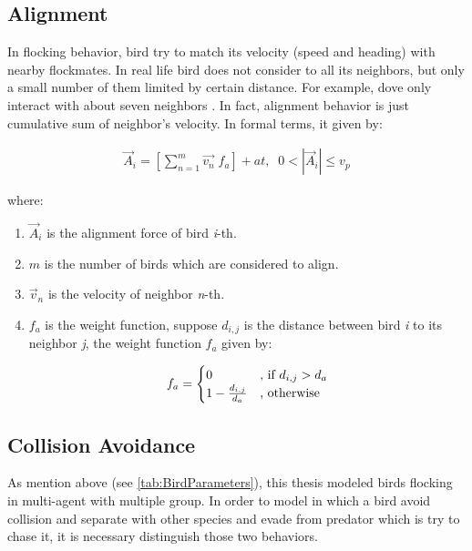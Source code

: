 \documentclass[journal,transmag]{IEEEtran}
\begin{document}
\subsection{Alignment}
In flocking behavior, bird try to match its velocity (speed and heading) with nearby flockmates. In real life bird does not consider to all its neighbors, but only a small number of them limited by certain distance. For example, dove only interact with about seven neighbors \cite{phys.org}. In fact, alignment behavior is just cumulative sum of neighbor's velocity. In formal terms, it given by:

\begin{align}
\vec{A}_i = \left[\sum_{n=1}^m{\vec{v_n}}\;f_a\right] + at, \;\;0 < |\vec{A}_i| \leq v_p
\end{align}

where:

\begin{enumerate}
\item \(\vec{A}_i\) is the alignment force of bird \emph{i}-th. 
\item \(m\) is the number of birds which are considered to align.
\item \(\vec{v}_n\) is the velocity of neighbor \emph{n}-th.
\item \(f_a\) is the weight function, suppose \(d_{i,j}\) is the distance between bird \emph{i} to its neighbor \emph{j}, the weight function \(f_a\) given by:

\begin{equation*}
	f_a = \begin{cases}
	0 &\text{, if $ d_{i,j} > d_a$}\\
	1- \frac{d_{i,j}}{d_a} &\text{, otherwise}
	\end{cases}
\end{equation*}
\end{enumerate}

\subsection{Collision Avoidance}

As mention above (see \ref{tab:BirdParameters}), this thesis modeled birds flocking in multi-agent with multiple group. In order to model in which a bird avoid collision and separate with other species and evade from predator which is try to chase it, it is necessary distinguish those two behaviors. 
\end{document}
